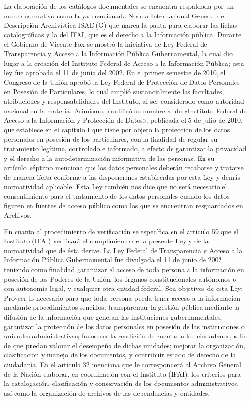 \enlargethispage{1\baselineskip}
La elaboración de los catálogos documentales se encuentra respaldada 
por un marco normativo como la ya mencionada Norma Internacional 
General de Descripción Archivística ISAD\,(G) que marca la pauta para 
elaborar las fichas catalográficas y la  del IFAI, que es el derecho a la 
Información pública. Durante el Gobierno de Vicente Fox se mostró la 
iniciativa de Ley Federal de Transparencia y Acceso a la Información 
Pública Gubernamental, la cual dio lugar a la creación del Instituto 
Federal de Acceso a la Información Pública; esta ley fue aprobada el 11 
de junio del 2002. En el primer semestre de 2010, el Congreso de la 
Unión aprobó la Ley Federal de Protección de Datos Personales en 
Posesión de Particulares, lo cual amplió sustancialmente las 
facultades, atribuciones y responsabilidades del Instituto, al ser 
considerado como autoridad nacional en la materia. Asimismo, modificó 
su nombre al de «Instituto Federal de Acceso a la Información y 
Protección de Datos», publicada el 5 de julio de 2010, que establece en el 
capítulo I que tiene por objeto la protección de los datos personales 
en posesión de los particulares, con la finalidad de regular su 
tratamiento legítimo, controlado e informado, a efecto de garantizar la 
privacidad y el derecho a la autodeterminación informativa de las 
personas. En su \mbox{artículo séptimo} menciona que los datos personales 
deberán recabarse y tratarse de manera lícita conforme a las 
disposiciones establecidas por esta Ley y demás normatividad aplicable. 
Esta Ley también nos dice que no será necesario el consentimiento para 
el tratamiento de los datos personales cuando los datos figuren en 
fuentes de acceso público como los que se encuentran resguardados en 
Archivos.  

En cuanto al procedimiento de verificación se específica en el artículo 
59 que el Instituto (IFAI) verificará el cumplimiento de la presente 
Ley y de la normatividad que de ésta derive. La Ley Federal de 
Transparencia y Acceso a la Información Pública Gubernamental fue 
divulgada el 11 de junio de 2002 teniendo como finalidad garantizar el 
acceso de toda persona a la información en posesión de los Poderes de 
la Unión, los órganos constitucionales autónomos o con autonomía legal, 
y cualquier otra entidad federal. Son objetivos de esta Ley: Proveer lo 
necesario para que toda persona pueda tener acceso a la información 
mediante procedimientos sencillos; transparentar la gestión pública 
mediante la difusión de la información que generan las instituciones 
gubernamentales; garantizar la protección de los datos personales en 
posesión de las instituciones o unidades administrativas; favorecer la 
rendición de cuentas a los ciudadanos, a fin de que puedan valorar el 
desempeño de dichas unidades; mejorar la organización, clasificación y 
manejo de los documentos, y contribuir estado de derecho de la 
ciudadanía. En el artículo 32 menciona que le corresponderá al Archivo 
General de la Nación elaborar, en coordinación con el Instituto (IFAI), 
los criterios para la catalogación, clasificación y conservación de los 
documentos administrativos, así como la organización de archivos de las 
dependencias y entidades. 

